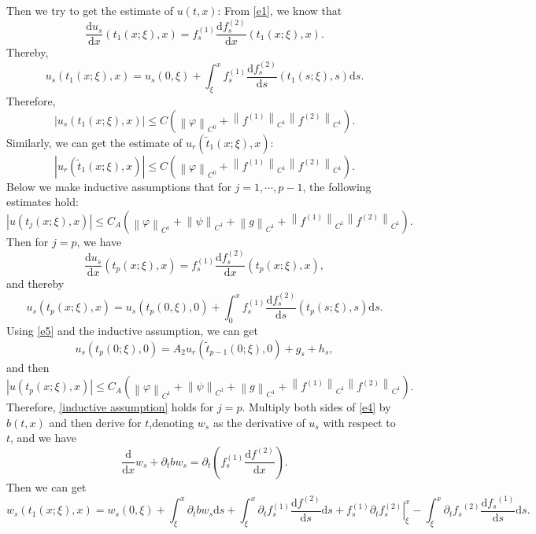 \documentclass[a4paper,reqno,11pt]{amsart}
\numberwithin{equation}{section} %
\begin{document}
Then we try to get the estimate of $u(t,x)$:
From \eqref{e1}, we know that
$$
\frac{\mathrm{d}u_s}{\mathrm{d}x}\left( t_1(x;\xi ),x \right) =f_{s}^{(1)}\frac{\mathrm{d}f_{s}^{(2)}}{\mathrm{d}x}\left( t_1(x;\xi ),x \right) .
$$
Thereby,
$$
u_s\left( t_1\left( x;\xi \right) ,x \right) =u_s(0,\xi )+\int_{\xi}^x{f_{s}^{(1)}\frac{\mathrm{d}f_{s}^{(2)}}{\mathrm{d}s}\left( t_1\left( s;\xi \right) ,s \right) \mathrm{d}s}.
$$
Therefore,
$$
\left| u_s\left( t_1(x;\xi ),x \right) \right|\leq C\left( \left\| \varphi \right\| _{C^0}+\left\| f^{(1)} \right\| _{C^1}\left\| f^{(2)} \right\| _{C^1} \right) .
$$
Similarly, we can get the estimate of $u_r\left( \tilde{t} _1(x;\xi ),x \right) $:
$$
\left| u_r\left( \tilde{t} _1(x;\xi ),x \right) \right|\leq C\left( \left\| \varphi \right\| _{C^0}+\left\| f^{(1)} \right\| _{C^1}\left\| f^{(2)} \right\| _{C^1} \right) .
$$
Below we make inductive assumptions that for $j=1,\cdots,p-1$, the following estimates hold:
\begin{equation}\label{inductive assumption}
\left| u\left( t_j(x;\xi ),x \right) \right|\leq C_A\left( \left\| \varphi \right\| _{C^1}+\left\| \psi \right\| _{C^1}+\left\| g \right\| _{C^1}+\left\| f^{(1)} \right\| _{C^1}\left\| f^{(2)} \right\| _{C^1} \right) .
\end{equation}
Then for $j=p$, we have
$$
\frac{\mathrm{d}u_s}{\mathrm{d}x}\left( t_p(x;\xi ),x \right) =f_{s}^{(1)}\frac{\mathrm{d}f_{s}^{(2)}}{\mathrm{d}x}\left( t_p(x;\xi ),x \right) ,
$$
and thereby
$$
u_s\left( t_p\left( x;\xi \right) ,x \right) =u_s(t_p(0,\xi ),0)+\int_{0}^x{f_{s}^{(1)}\frac{\mathrm{d}f_{s}^{(2)}}{\mathrm{d}s}\left( t_p\left( s;\xi \right) ,s \right) \mathrm{d}s}.
$$
Using \eqref{e5} and the inductive assumption, we can get
$$
u_s\left(t_p(0 ; \xi), 0\right)=A_2 u_r\left(\tilde{t}_{p-1}(0 ; \xi), 0\right)+g_s+h_s ,
$$
and then
$$
\left| u\left( t_p(x;\xi ),x \right) \right|\leq C_A\left( \left\| \varphi \right\| _{C^1}+\left\| \psi \right\| _{C^1}+\left\| g \right\| _{C^1}+\left\| f^{(1)} \right\| _{C^1}\left\| f^{(2)} \right\| _{C^1} \right) .
$$
Therefore, \eqref{inductive assumption} holds for $j=p$.
Multiply both sides of \eqref{e4} by $b(t,x)$ and then derive for $t$,denoting $w_s$ as the derivative of $u_s$ with respect to $t$, and we have
$$
\frac{\mathrm{d}}{\mathrm{d}x}w_s+\partial _tbw_s=\partial _t\left( f_{s}^{(1)}\frac{\mathrm{d}f^{(2)}}{\mathrm{d}x} \right). 
$$
Then we can get
\begin{equation}\label{e of w_s 1}
w_s\left( t_1(x;\xi ),x \right) =w_s(0,\xi )+\int_{\xi}^x{\partial _tbw_s\mathrm{d}s}+\int_{\xi}^x{\partial _tf_{s}^{(1)}\frac{\mathrm{d}f^{(2)}}{\mathrm{d}s}\mathrm{d}s}+\left. f_{s}^{(1)}\partial _tf_{s}^{(2)} \right|_{\xi}^{x}-\int_{\xi}^x{\partial _t{f_s}^{(2)}\frac{\mathrm{d}{f_s}^{(1)}}{\mathrm{d}s}\mathrm{d}s}.
\end{equation}
\end{document}
